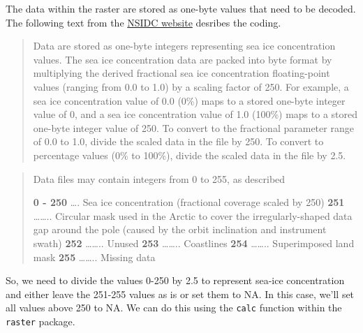 \documentclass[]{article}
\begin{document}
The data within the raster are stored as one-byte values that need to be
decoded. The following text from the
\href{http://nsidc.org/data/docs/daac/nsidc0051\_gsfc\_seaice.gd.html\#paramrange}{NSIDC
website} desribes the coding.

\begin{quote}
Data are stored as one-byte integers representing sea ice concentration
values. The sea ice concentration data are packed into byte format by
multiplying the derived fractional sea ice concentration floating-point
values (ranging from 0.0 to 1.0) by a scaling factor of 250. For
example, a sea ice concentration value of 0.0 (0\%) maps to a stored
one-byte integer value of 0, and a sea ice concentration value of 1.0
(100\%) maps to a stored one-byte integer value of 250. To convert to
the fractional parameter range of 0.0 to 1.0, divide the scaled data in
the file by 250. To convert to percentage values (0\% to 100\%), divide
the scaled data in the file by 2.5.
\end{quote}

\begin{quote}
Data files may contain integers from 0 to 255, as described

\textbf{0 - 250} \ldots{}. Sea ice concentration (fractional coverage
scaled by 250) \textbf{251} \ldots{}\ldots{}.. Circular mask used in the
Arctic to cover the irregularly-shaped data gap around the pole (caused
by the orbit inclination and instrument swath) \textbf{252}
\ldots{}\ldots{}.. Unused \textbf{253} \ldots{}\ldots{}.. Coastlines
\textbf{254} \ldots{}\ldots{}.. Superimposed land mask \textbf{255}
\ldots{}\ldots{}.. Missing data
\end{quote}

So, we need to divide the values 0-250 by 2.5 to represent sea-ice
concentration and either leave the 251-255 values as is or set them to
NA. In this case, we'll set all values above 250 to NA. We can do this
using the \texttt{calc} function within the \texttt{raster} package.
\end{document}
